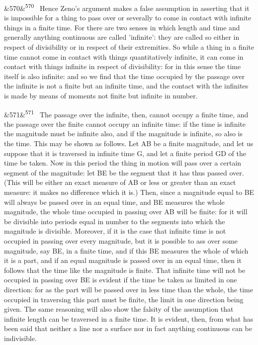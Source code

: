 \documentclass[12pt]{article}
\newcommand{\para}[1][]{\par\noindent\ifx&#1&\else\textsuperscript{\footnotesize #1}~\fi}
\begin{document}
\para[570] Hence Zeno's argument makes a false assumption in asserting that it is impossible for a thing to pass over or severally to come in contact with infinite things in a finite time. For there are two senses in which length and time and generally anything continuous are called 'infinite': they are called so either in respect of divisibility or in respect of their extremities. So while a thing in a finite time cannot come in contact with things quantitatively infinite, it can come in contact with things infinite in respect of divisibility: for in this sense the time itself is also infinite: and so we find that the time occupied by the passage over the infinite is not a finite but an infinite time, and the contact with the infinites is made by means of moments not finite but infinite in number.

\para[571] The passage over the infinite, then, cannot occupy a finite time, and the passage over the finite cannot occupy an infinite time: if the time is infinite the magnitude must be infinite also, and if the magnitude is infinite, so also is the time. This may be shown as follows. Let AB be a finite magnitude, and let us suppose that it is traversed in infinite time G, and let a finite period GD of the time be taken. Now in this period the thing in motion will pass over a certain segment of the magnitude: let BE be the segment that it has thus passed over. (This will be either an exact measure of AB or less or greater than an exact measure: it makes no difference which it is.) Then, since a magnitude equal to BE will always be passed over in an equal time, and BE measures the whole magnitude, the whole time occupied in passing over AB will be finite: for it will be divisible into periods equal in number to the segments into which the magnitude is divisible. Moreover, if it is the case that infinite time is not occupied in passing over every magnitude, but it is possible to ass over some magnitude, say BE, in a finite time, and if this BE measures the whole of which it is a part, and if an equal magnitude is passed over in an equal time, then it follows that the time like the magnitude is finite. That infinite time will not be occupied in passing over BE is evident if the time be taken as limited in one direction: for as the part will be passed over in less time than the whole, the time occupied in traversing this part must be finite, the limit in one direction being given. The same reasoning will also show the falsity of the assumption that infinite length can be traversed in a finite time. It is evident, then, from what has been said that neither a line nor a surface nor in fact anything continuous can be indivisible.
\end{document}
